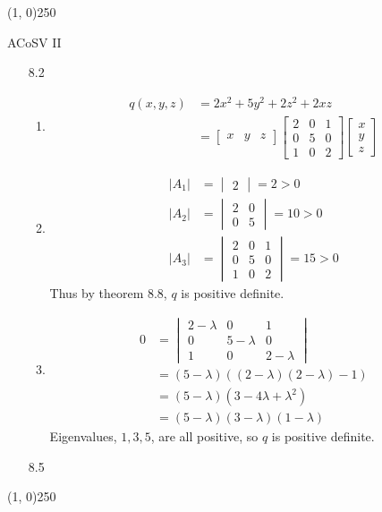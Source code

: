 \documentclass[11pt,letterpaper]{article}
\begin{document}
\begin{center}
\line(1, 0){250}
\end{center}

\noindent
ACoSV II

\begin{enumerate}
\item[8.2]
  \begin{enumerate}
  \item
    \begin{align*}
      q(x,y,z) &= 2x^2+5y^2+2z^2+2xz \\
          &= \begin{bmatrix}x & y & z\end{bmatrix}
             \begin{bmatrix}
               2 & 0 & 1 \\
               0 & 5 & 0 \\
               1 & 0 & 2
             \end{bmatrix}
             \begin{bmatrix}x \\ y \\ z\end{bmatrix}
    \end{align*}

  \item
    \begin{align*}
      |A_1| &= \begin{vmatrix}2\end{vmatrix} = 2 > 0 \\
      |A_2| &= \begin{vmatrix}2 & 0 \\ 0 & 5 \end{vmatrix} = 10 > 0 \\
      |A_3| &= 
             \begin{vmatrix}
               2 & 0 & 1 \\
               0 & 5 & 0 \\
               1 & 0 & 2
             \end{vmatrix}
            = 15 > 0
    \end{align*}
    Thus by theorem 8.8, $q$ is positive definite.

  \item
    \begin{align*}
      0 &= \begin{vmatrix}
             2-\lambda & 0 & 1 \\
             0 & 5-\lambda & 0 \\
             1 & 0 & 2-\lambda
           \end{vmatrix} \\
        &= (5-\lambda)((2-\lambda)(2-\lambda)-1) \\
        &= (5-\lambda)\left(3-4\lambda+\lambda^2\right) \\
        &= (5-\lambda)(3-\lambda)(1-\lambda)
    \end{align*}
    Eigenvalues, $1,3,5$, are all positive, so $q$ is positive definite.
  \end{enumerate}

\item[8.5]
\end{enumerate}

\begin{center}
\line(1, 0){250}
\end{center}
\end{document}

